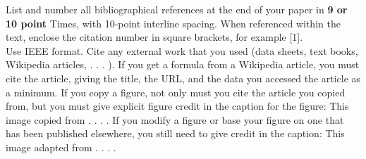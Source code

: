 \documentclass[journal]{IEEEtran}
\begin{document}
List and number all bibliographical 
references at the end of your paper in {\bf 9 or 10 point} Times, with 10-point interline spacing. When referenced within the text, enclose the citation number in square brackets, for example [1].\\[0.1in]
Use IEEE format. Cite any external work that you used (data sheets, text books, Wikipedia articles, . . . ). If you get a formula from a Wikipedia article, you must cite the article, giving the title, the URL, and the data you accessed the article as a minimum. If you copy a figure, not only must you cite the article you copied from, but you must give explicit figure credit in the caption for the figure: This image copied from . . . . If you modify a figure or base your figure on one that has been published elsewhere, you still need to give credit in the caption: This image adapted from . . . .
\end{document}
